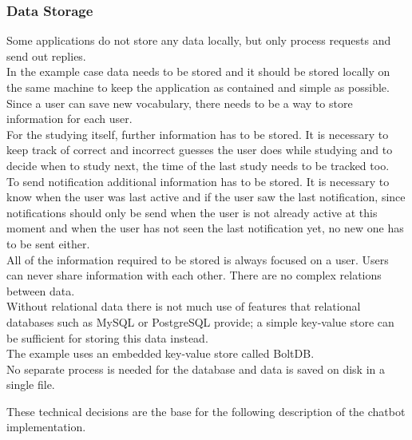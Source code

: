 \subsubsection{Data Storage}

Some applications do not store any data locally, but only process requests and send out replies.
\\
In the example case data needs to be stored and it should be stored locally on the same machine
to keep the application as contained and simple as possible.
\\

Since a user can save new vocabulary,
there needs to be a way to store information for each user.
\\
For the studying itself, further information has to be stored.
It is necessary to keep track of correct and incorrect guesses the user does while studying
and to decide when to study next, the time of the last study needs to be tracked too.
\\

To send notification additional information has to be stored.
It is necessary to know when the user was last active and if the user saw the last notification,
since notifications should only be send when the user is not already active at this moment
and when the user has not seen the last notification yet, no new one has to be sent either.
\\

All of the information required to be stored is always focused on a user.
Users can never share information with each other.
There are no complex relations between data.
\\
Without relational data there is not much use of features that relational databases such as MySQL or PostgreSQL provide;
a simple key-value store can be sufficient for storing this data instead.
\\
The example uses an embedded key-value store called BoltDB\cite{boltdb}.
\\
No separate process is needed for the database and data is saved on disk in a single file.



These technical decisions are the base for the following description of the chatbot implementation.
